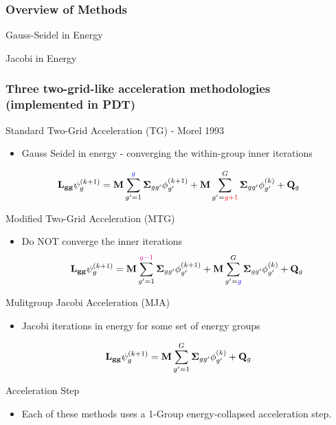 \documentclass[compress,10pt]{beamer}
\newcommand{\tcr}[1]{\textcolor{red}{#1}}
\newcommand{\tcb}[1]{\textcolor{blue}{#1}}
\newcommand{\tcm}[1]{\textcolor{magenta}{#1}}
\begin{document}
\begin{frame}[t]\frametitle{Overview of Methods}
\begin{block}{Gauss-Seidel in Energy}

\end{block}
\begin{block}{Jacobi in Energy}

\end{block}
\end{frame}
\begin{frame}[t]\frametitle{Three two-grid-like acceleration methodologies (implemented in PDT)}{\footnotesize
\vspace{-2.5mm}
\begin{block}{Standard Two-Grid Acceleration (TG) - Morel 1993}
\begin{itemize}
\item Gauss Seidel in energy - converging the within-group inner iterations
\end{itemize}
\begin{equation*}
{\bf L_{gg}} \psi_g^{(k+1)} = {\bf M} \sum_{g'=1}^{\tcb{g}} {\bf \Sigma}_{g g'} \phi_{g'}^{(k+1)} + {\bf M} \sum_{g'=\tcr{g+1}}^G {\bf \Sigma}_{g g'} \phi_{g'}^{(k)} + {\bf Q}_g
\end{equation*}
\end{block}
\vspace{-2.5mm}
\begin{block}{Modified Two-Grid Acceleration (MTG)}
\begin{itemize}
\item Do NOT converge the inner iterations
\begin{equation*}
{\bf L_{gg}} \psi_g^{(k+1)} = {\bf M} \sum_{g'=1}^{\tcm{g-1}} {\bf \Sigma}_{g g'} \phi_{g'}^{(k+1)} + {\bf M} \sum_{g'=\tcb{g}}^G {\bf \Sigma}_{g g'} \phi_{g'}^{(k)} + {\bf Q}_g
\end{equation*}
\end{itemize}
\end{block}
\vspace{-2.5mm}
\begin{block}{Mulitgroup Jacobi Acceleration (MJA)}
\begin{itemize}
\item Jacobi iterations in energy for some set of energy groups
\end{itemize}
\begin{equation*}
{\bf L_{gg}} \psi_g^{(k+1)} = {\bf M} \sum_{g'=1}^G {\bf \Sigma}_{g g'} \phi_{g'}^{(k)} + {\bf Q}_g
\end{equation*}
\end{block}
\vspace{-2.5mm}
\begin{block}{Acceleration Step}
\begin{itemize}
\item Each of these methods uses a 1-Group energy-collapsed acceleration step.
\end{itemize}
\end{block}
}
\end{frame}
\end{document}
